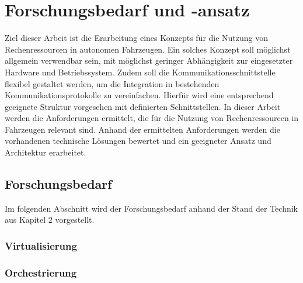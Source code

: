 \chapter{Forschungsbedarf und -ansatz}

Ziel dieser Arbeit ist die Erarbeitung eines Konzepts für die Nutzung von Rechenressourcen in autonomen Fahrzeugen. Ein solches Konzept soll möglichst allgemein verwendbar sein, mit möglichst geringer Abhängigkeit zur eingesetzter Hardware und Betriebssystem. Zudem soll die Kommunikationsschnittstelle flexibel gestaltet werden, um die Integration in bestehenden Kommunikationsprotokolle zu vereinfachen. Hierfür wird eine entsprechend geeignete Struktur vorgesehen mit definierten Schnittstellen. In dieser Arbeit werden die Anforderungen ermittelt, die für die Nutzung von Rechenressourcen in Fahrzeugen relevant sind. Anhand der ermittelten Anforderungen werden die vorhandenen technische Lösungen bewertet und ein geeigneter Ansatz und Architektur erarbeitet.



\section{Forschungsbedarf}

Im folgenden Abschnitt wird der Forschungsbedarf anhand der Stand der Technik aus Kapitel 2 vorgestellt. 

\subsection{Virtualisierung}

\subsection{Orchestrierung}

